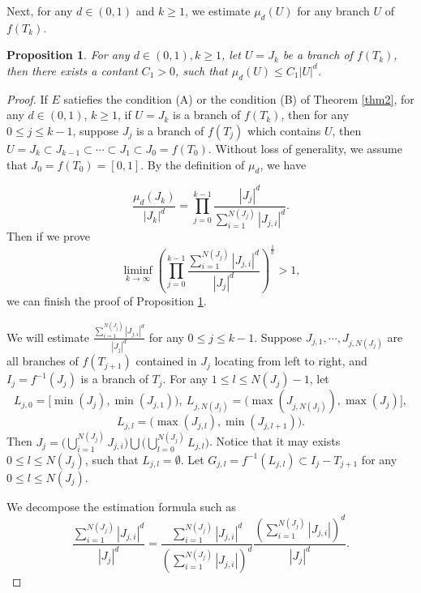 \documentclass[reqno]{amsart}
\theoremstyle{plain}
\newtheorem{proposition}{Proposition}
\theoremstyle{definition}
\theoremstyle{remark}
\numberwithin{equation}{section} \DeclareMathOperator\intr{int}
\begin{document}
Next, for any $d\in(0,1)$ and $k\ge 1$, we estimate  $\mu_d(U)$ for any branch $U$ of $f(T_k)$.

\begin{proposition}\label{p1} For any $d\in(0,1), k\ge1$, let $U=J_k$ be a branch of $f(T_k)$, then there exists a contant $C_1>0$, such that $\mu _d(U)\le C_1|U|^{d}$.
\end{proposition}

\begin{proof}
If $E$ satiefies the condition {\rm(A)} or the condition {\rm(B)} of Theorem {\rm\ref{thm2}}, for any $d\in(0,1)$, $k\ge 1$,
if $U=J_k$ is a branch of $f(T_k)$, then for any $0\le j\le k-1$, suppose $J_j$ is a branch of $f(T_j)$ which contains $U$, then
$U=J_k\subset J_{k-1}\subset \cdots \subset J_1\subset J_0=f(T_0).$ Without loss of generality, we  assume that $J_0=f(T_0)=[0,1]$.
By the definition of $\mu_d$, we have

\begin{equation*}
\frac{\mu_d(J_k)}{\left | J_k \right |^d }=\prod_{j=0}^{k-1}\frac{\left | J_j \right |^d}{\sum_{i=1}^{N(J_j)}\left | J_{j,i} \right |^d}.
\end{equation*}
Then if we prove
\begin{equation*}
\liminf\limits_{k \to\infty} (\prod_{j=0}^{k-1}\frac{\sum_{i=1}^{N(J_j)}\left | J_{j,i} \right |^d}{\left | J_j \right |^d})^{\frac{1}{k}}>1,
\end{equation*}
we can finish the proof of  Proposition \ref{p1}.

We will estimate $\frac{\sum_{i=1}^{N(J_j)}\left | J_{j,i} \right |^d}{\left | J_j \right |^d}$ for any $0\le j\le k-1.$ Suppose $J_{j,1},\cdots, J_{j,N(J_j)}$ are all branches of $f(T_{j+1})$ contained in $J_j$ locating from left to right, and  $I_j=f^{-1}(J_j)$ is a branch of $T_j$. For any $1\le l\le N(J_j)-1$,  let
$$L_{j,0}=\big[\min(J_j),\min(J_{j,1})\big),~L_{j,N(J_j)}=\big(\max(J_{j,N(J_j)}),\max(J_j)\big],$$
$$L_{j,l}=\big(\max(J_{j,l}),\min(J_{j,l+1})\big).$$
Then $J_j=\big(\bigcup_{i=1}^{N(J_j)}J_{j,i} \big)\bigcup \big(\bigcup_{l=0}^{N(J_j)}L_{j,l} \big)$. Notice that it may exists $0\le l\le N(J_j)$, such that $L_{j,l}=\emptyset$.
Let $G_{j,l}=f^{-1}(L_{j,l})\subset I_j-T_{j+1}$ for any $0\le l \le N(J_j)$.

We decompose the estimation formula such as
\begin{equation}\label{p11}
\frac{\sum_{i=1}^{N(J_j)}\left | J_{j,i} \right |^d }{\left | J_j \right |^d }= \frac{\sum_{i=1}^{N(J_j)}\left | J_{j,i} \right |^d }{(\sum_{i=1}^{N(J_j)}\left | J_{j,i} \right |)^d }\frac{{(\sum_{i=1}^{N(J_j)}\left | J_{j,i} \right |)^d }}{\left | J_j \right |^d}.
\end{equation}


\end{proof}
\end{document}
